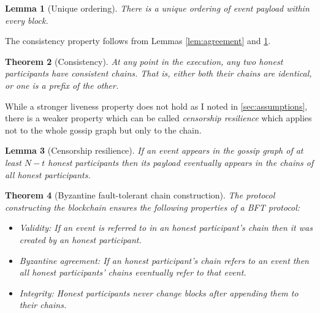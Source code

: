 \documentclass[a4paper,11pt]{article}
\newtheorem{theorem}{Theorem}[section]
\newtheorem{lemma}[theorem]{Lemma}
\begin{document}
\begin{lemma}[Unique ordering]\label{lem:ordering}
  There is a unique ordering of event payload within every block.
\end{lemma}

The consistency property follows from Lemmas \ref{lem:agreement} and \ref{lem:ordering}.
\begin{theorem}[Consistency]
  At any point in the execution, any two honest participants have consistent chains. That is, either
  both their chains are identical, or one is a prefix of the other.
\end{theorem}

While a stronger liveness property does not hold as I noted in \ref{sec:assumptions}, there is a
weaker property which can be called \emph{censorship resilience} which applies not to the whole
gossip graph but only to the chain.
\begin{lemma}[Censorship resilience]
  If an event appears in the gossip graph of at least $N - t$ honest participants then its payload
  eventually appears in the chains of all honest participants.
\end{lemma}

\begin{theorem}[Byzantine fault-tolerant chain construction]
  The protocol constructing the blockchain ensures the following properties of a BFT protocol:
  \begin{itemize}
  \item Validity: If an event is referred to in an honest participant's chain then it was created by
    an honest participant.
  \item Byzantine agreement: If an honest participant's chain refers to an event then all honest
    participants' chains eventually refer to that event.
  \item Integrity: Honest participants never change blocks after appending them to their chains.
  \end{itemize}
\end{theorem}
\end{document}
